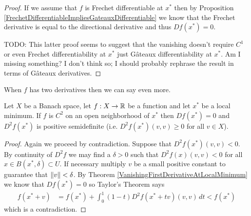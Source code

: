 \begin{proof}
If we assume that $f$ is Frechet differentiable at $x^*$ then by Proposition \ref{FrechetDifferentiableImpliesGateauxDifferentiable} we know that
the Frechet derivative is equal to the directional derivative and thus $Df(x^*)=0$.

TODO: This latter proof seems to suggest that the vanishing doesn't require $C^1$ or even Frechet differentiability at $x^*$ just G\^{a}teaux differentiability at $x^*$.  Am I missing something?  I don't think so; I should probably rephrase the result in terms of  G\^{a}teaux derivatives.
\end{proof}

When $f$ has two derivatives then we can say even more.
\begin{thm}\label{PositiveSemidefiniteSecondDerivativeAtLocalMinimum}Let $X$ be a
  Banach space, let $f : X \to \mathbb{R}$ be a function and let $x^*$ be
  a local minimum.  If $f$ is $C^2$ on an open neighborhood of $x^*$
  then $Df(x^*) = 0$ and $D^2f(x^*)$ is positive semidefinite
  (i.e. $D^2f(x^*) (v,v) \geq 0$ for all $v \in X$).
\end{thm}
\begin{proof}
Again we proceed by contradiction.  Suppose that $D^2f(x^*)(v,v) < 0$.
By continuity of $D^2f$ we may find a $\delta > 0$ such that $D^2f(x)(v,v) < 0$ for
all $x \in B(x^*,\delta) \subset U$.  If necessary multiply $v$ be a
small positive constant to guarantee that $\left \lVert v \right \rVert < \delta$.  By Theorem \ref{VanishingFirstDerivativeAtLocalMinimum} we know that
$Df(x^*) = 0$ so Taylor's Theorem says
\begin{align*}
f(x^* + v) &= f(x^*) + \int_0^1 (1 - t) D^2f(x^* + tv) (v,v) \, dt < f(x^*)
\end{align*}
which is a contradiction.
\end{proof}

